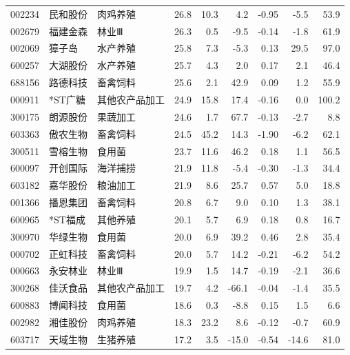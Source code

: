 \begin{longtable}{@{}llp{1.9cm}rrrrrr@{}}
002234 & 民和股份 & 肉鸡养殖 & 26.8 & 10.3 & 4.2 & -0.95 & -5.5 & 53.9 \\
002679 & 福建金森 & 林业Ⅲ & 26.3 & 0.5 & -9.5 & -0.14 & -1.8 & 61.9 \\
002069 & 獐子岛 & 水产养殖 & 25.8 & 7.3 & -5.3 & 0.13 & 29.5 & 97.0 \\
600257 & 大湖股份 & 水产养殖 & 25.7 & 4.3 & 2.0 & 0.17 & 2.1 & 46.4 \\
688156 & 路德科技 & 畜禽饲料 & 25.6 & 2.1 & 42.9 & 0.09 & 1.2 & 55.9 \\
000911 & *ST广糖 & 其他农产品加工 & 24.9 & 15.8 & 17.4 & -0.16 & 0.0 & 100.2 \\
300175 & 朗源股份 & 果蔬加工 & 24.6 & 1.7 & 67.7 & -0.13 & -2.7 & 8.8 \\
603363 & 傲农生物 & 畜禽饲料 & 24.5 & 45.2 & 14.3 & -1.90 & -6.2 & 62.1 \\
300511 & 雪榕生物 & 食用菌 & 23.7 & 11.6 & 46.2 & 0.18 & 1.1 & 56.5 \\
600097 & 开创国际 & 海洋捕捞 & 21.9 & 11.8 & -5.4 & -0.30 & -1.3 & 34.4 \\
603182 & 嘉华股份 & 粮油加工 & 21.9 & 8.6 & 25.7 & 0.57 & 5.0 & 18.8 \\
001366 & 播恩集团 & 畜禽饲料 & 20.8 & 6.7 & 9.0 & 0.10 & 1.3 & 38.1 \\
600965 & *ST福成 & 其他养殖 & 20.1 & 5.7 & 6.9 & 0.18 & 0.8 & 16.7 \\
300970 & 华绿生物 & 食用菌 & 20.0 & 6.9 & 39.2 & 0.46 & 2.8 & 35.4 \\
000702 & 正虹科技 & 畜禽饲料 & 20.0 & 5.7 & 14.2 & -0.21 & -6.2 & 54.2 \\
000663 & 永安林业 & 林业Ⅲ & 19.9 & 1.5 & 14.7 & -0.19 & -2.1 & 36.6 \\
300268 & 佳沃食品 & 其他农产品加工 & 19.7 & 4.2 & -66.1 & -0.04 & -1.4 & 35.5 \\
600883 & 博闻科技 & 食用菌 & 18.6 & 0.3 & -8.8 & 0.15 & 1.5 & 6.6 \\
002982 & 湘佳股份 & 肉鸡养殖 & 18.3 & 23.2 & 8.6 & -0.12 & -0.7 & 60.9 \\
603717 & 天域生物 & 生猪养殖 & 17.2 & 3.5 & -15.0 & -0.54 & -14.6 & 81.0 \\
\end{longtable}
\endgroup
